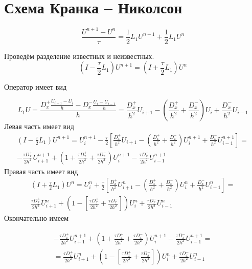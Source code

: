 \documentclass[a4paper,12pt]{article}
\begin{document}
\renewcommand{\contentsname}{Содержание}
\renewcommand{\figurename}{Рис.}
\renewcommand{\bibname}{Список литературы}
\renewcommand{\refname}{Список литературы}
\renewcommand{\tablename}{Таблица}


\section{Схема Кранка -- Николсон}
\begin{equation}
  \label{eq:Crank-Nicolson}
    \frac{U^{n+1} - U^n}{\tau} = \frac{1}{2} L_1 U^{n+1}  + \frac{1}{2} L_1 U^n
\end{equation}

Проведём разделение известных и неизвестных.
\begin{equation}
    \left( I - \frac{\tau}{2} L_1 \right) U^{n+1} = \left( I + \frac{\tau}{2} L_1 \right) U^n
\end{equation}

Оператор имеет вид

\begin{equation*}
  L_1 U = \frac{D^+_x \frac{U_{i+1} - U_{i}}{h} - D^-_x\frac{U_{i} - U_{i-1}}{h}}{h} = \frac{D^+_x}{h^2}U_{i+1} - \left( \frac{D^+_x}{h^2} + \frac{D^-_x}{h^2} \right)U_{i} +  \frac{D^-_x}{h^2}U_{i-1}
\end{equation*}
Левая часть имеет вид
\begin{multline*}
    \left( I - \frac{\tau}{2} L_1 \right) U^{n+1} = U^{n+1}_i - \frac{\tau}{2} \left[ \frac{D^+_x}{h^2}U_{i+1} - \left( \frac{D^+_x}{h^2} + \frac{D^-_x}{h^2} \right) U^{n+1}_{i} +  \frac{D^-_x}{h^2}U^{n+1}_{i-1} \right] = \\
    - \frac{\tau D^+_x}{2h^2}U^{n+1}_{i+1} + \left(1 + \frac{\tau D^+_x}{2 h^2} + \frac{\tau D^-_x}{2 h^2} \right) U^{n+1}_{i} - \frac{\tau D^-_x}{2h^2}U^{n+1}_{i-1}
\end{multline*}
Правая часть имеет вид
\begin{multline*}
    \left( I + \frac{\tau}{2} L_1 \right) U^{n} = U^{n}_i + \frac{\tau}{2} \left[ \frac{D^+_x}{h^2}U^{n}_{i+1} - \left( \frac{D^+_x}{h^2} + \frac{D^-_x}{h^2} \right) U^{n}_{i} +  \frac{D^-_x}{h^2}U^{n}_{i-1} \right] = \\
    \frac{\tau D^+_x}{2h^2}U^{n}_{i+1} + \left(1 - \left[\frac{\tau D^+_x}{2 h^2} + \frac{\tau D^-_x}{2 h^2} \right] \right) U^{n}_{i} + \frac{\tau D^-_x}{2h^2}U^{n}_{i-1}
\end{multline*}
Окончательно имеем

\begin{multline*}
  - \frac{\tau D^+_x}{2h^2}U^{n+1}_{i+1} + \left(1 + \frac{\tau D^+_x}{2 h^2} + \frac{\tau D^-_x}{2 h^2} \right) U^{n+1}_{i} - \frac{\tau D^-_x}{2h^2}U^{n+1}_{i-1}= \\
  = \frac{\tau D^+_x}{2h^2}U^{n}_{i+1} + \left(1 - \left[ \frac{\tau D^+_x}{2 h^2} + \frac{\tau D^-_x}{2 h^2} \right] \right) U^{n}_{i} + \frac{\tau D^-_x}{2h^2}U^{n}_{i-1}
\end{multline*}
\end{document}
